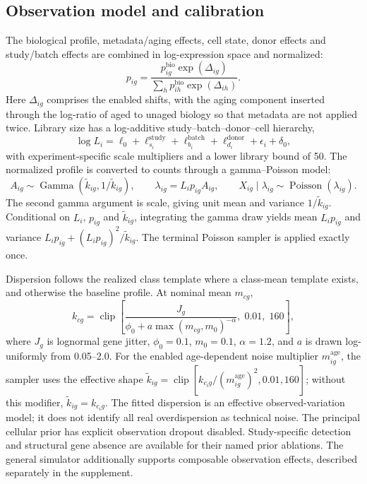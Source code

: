 \subsection*{Observation model and calibration}
\label{sec:simulator-observation}

The biological profile, metadata/aging effects, cell state, donor effects and study/batch effects are combined in log-expression space and normalized:
\begin{equation}
 p_{ig}=\frac{p^{\mathrm{bio}}_{ig}\exp(\Delta_{ig})}
 {\sum_h p^{\mathrm{bio}}_{ih}\exp(\Delta_{ih})}.
 \label{eq:simulator-profile}
\end{equation}
Here $\Delta_{ig}$ comprises the enabled shifts, with the aging component inserted through the log-ratio of aged to unaged biology so that metadata are not applied twice. Library size has a log-additive study--batch--donor--cell hierarchy,
\begin{equation}
 \log L_i=\ell_0+\ell^{\mathrm{study}}_{s_i}
 +\ell^{\mathrm{batch}}_{b_i}+\ell^{\mathrm{donor}}_{d_i}
 +\epsilon_i+\delta_0,
 \label{eq:simulator-library}
\end{equation}
with experiment-specific scale multipliers and a lower library bound of 50. The normalized profile is converted to counts through a gamma--Poisson model:
\begin{equation}
 A_{ig}\sim\operatorname{Gamma}(\tilde k_{ig},1/\tilde k_{ig}),\qquad
 \lambda_{ig}=L_ip_{ig}A_{ig},\qquad
 X_{ig}\mid\lambda_{ig}\sim\operatorname{Poisson}(\lambda_{ig}).
 \label{eq:simulator-counts}
\end{equation}
The second gamma argument is scale, giving unit mean and variance $1/\tilde k_{ig}$. Conditional on $L_i$, $p_{ig}$ and $\tilde k_{ig}$, integrating the gamma draw yields mean $L_ip_{ig}$ and variance $L_ip_{ig}+(L_ip_{ig})^2/\tilde k_{ig}$. The terminal Poisson sampler is applied exactly once.

Dispersion follows the realized class template where a class-mean template exists, and otherwise the baseline profile. At nominal mean $m_{cg}$,
\begin{equation}
 k_{cg}=\operatorname{clip}\!\left[
 \frac{J_g}{\phi_0+a\max(m_{cg},m_0)^{-\alpha}},\;0.01,\;160\right],
 \label{eq:simulator-dispersion}
\end{equation}
where $J_g$ is lognormal gene jitter, $\phi_0=0.1$, $m_0=0.1$, $\alpha=1.2$, and $a$ is drawn log-uniformly from 0.05--2.0. For the enabled age-dependent noise multiplier $m_{ig}^{\mathrm{age}}$, the sampler uses the effective shape $\tilde k_{ig}=\operatorname{clip}[k_{c_i g}/(m_{ig}^{\mathrm{age}})^2,0.01,160]$; without this modifier, $\tilde k_{ig}=k_{c_i g}$. The fitted dispersion is an effective observed-variation model; it does not identify all real overdispersion as technical noise. The principal cellular prior has explicit observation dropout disabled. Study-specific detection and structural gene absence are available for their named prior ablations. The general simulator additionally supports composable observation effects, described separately in the supplement.

